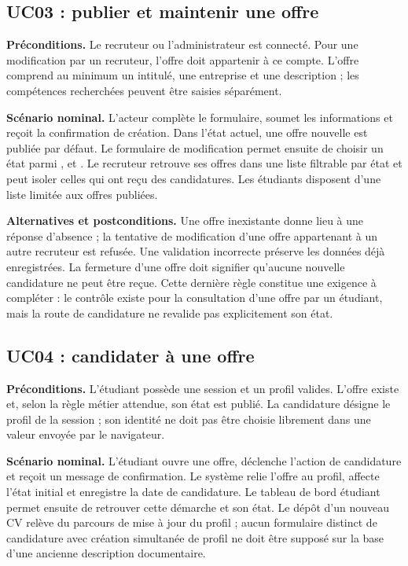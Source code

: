 \subsection{UC03 : publier et maintenir une offre}

\textbf{Préconditions.} Le recruteur ou l'administrateur est connecté. Pour une modification par un recruteur, l'offre doit appartenir à ce compte. L'offre comprend au minimum un intitulé, une entreprise et une description ; les compétences recherchées peuvent être saisies séparément.

\textbf{Scénario nominal.} L'acteur complète le formulaire, soumet les informations et reçoit la confirmation de création. Dans l'état actuel, une offre nouvelle est publiée par défaut. Le formulaire de modification permet ensuite de choisir un état parmi ,  et . Le recruteur retrouve ses offres dans une liste filtrable par état et peut isoler celles qui ont reçu des candidatures. Les étudiants disposent d'une liste limitée aux offres publiées.

\textbf{Alternatives et postconditions.} Une offre inexistante donne lieu à une réponse d'absence ; la tentative de modification d'une offre appartenant à un autre recruteur est refusée. Une validation incorrecte préserve les données déjà enregistrées. La fermeture d'une offre doit signifier qu'aucune nouvelle candidature ne peut être reçue. Cette dernière règle constitue une exigence à compléter : le contrôle existe pour la consultation d'une offre par un étudiant, mais la route de candidature ne revalide pas explicitement son état.

\subsection{UC04 : candidater à une offre}

\textbf{Préconditions.} L'étudiant possède une session et un profil valides. L'offre existe et, selon la règle métier attendue, son état est publié. La candidature désigne le profil de la session ; son identité ne doit pas être choisie librement dans une valeur envoyée par le navigateur.

\textbf{Scénario nominal.} L'étudiant ouvre une offre, déclenche l'action de candidature et reçoit un message de confirmation. Le système relie l'offre au profil, affecte l'état initial  et enregistre la date de candidature. Le tableau de bord étudiant permet ensuite de retrouver cette démarche et son état. Le dépôt d'un nouveau CV relève du parcours de mise à jour du profil ; aucun formulaire distinct de candidature avec création simultanée de profil ne doit être supposé sur la base d'une ancienne description documentaire.

